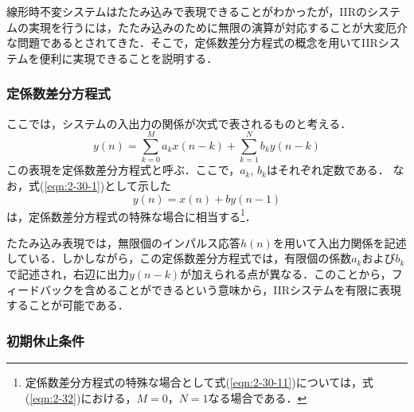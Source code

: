 線形時不変システムはたたみ込みで表現できることがわかったが，IIRのシステムの実現を行うには，たたみ込みのために無限の演算が対応することが大変厄介な問題であるとされてきた．そこで，定係数差分方程式の概念を用いてIIRシステムを便利に実現できることを説明する．

\subsubsection{定係数差分方程式}

ここでは，システムの入出力の関係が次式で表されるものと考える．
\begin{equation}
y(n)=\sum_{k=0}^{M}a_kx(n-k)+\sum_{k=1}^{N}b_ky(n-k)
\label{eqn:2-32}
\end{equation}
この表現を定係数差分方程式と呼ぶ．ここで，$a_k$, $b_k$はそれぞれ定数である．
%
なお，式(\ref{eqn:2-30-1})として示した
\begin{equation}
y(n)=x(n)+by(n-1)
\label{eqn:2-30-11}
\end{equation}
は，定係数差分方程式の特殊な場合に相当する\footnote{定係数差分方程式の特殊な場合として式(\ref{eqn:2-30-11})については，式(\ref{eqn:2-32})における，$M=0$，$N=1$なる場合である．}．


たたみ込み表現では，無限個のインパルス応答$h(n)$を用いて入出力関係を記述している．しかしながら，この定係数差分方程式では，有限個の係数$a_k$および$b_k$で記述され，右辺に出力$y(n-k)$が加えられる点が異なる．このことから，フィードバックを含めることができるという意味から，IIRシステムを有限に表現することが可能である．

\subsubsection{初期休止条件}

